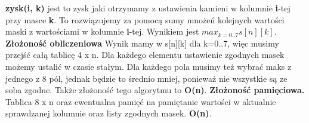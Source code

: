 \documentclass[a4paper,10pt]{article}
\begin{document}
 \textbf{zysk(i, k)} jest to zysk jaki otrzymamy z ustawienia kamieni w kolumnie \textbf{i}-tej przy masce \textbf{k}. To rozwiązujemy za pomocą sumy mnożeń kolejnych wartości maski z wartościami w kolumnie \textbf{i}-tej. \newline \newline
Wynikiem jest $max_{k=0..7}s[n][k]$. \newline \newline
\textbf{Złożoność obliczeniowa} \newline
Wynik mamy w s[n][k] dla k=0..7, więc musimy przejść całą tablicę 4 x n. Dla każdego elementu ustawienie zgodnych masek możemy ustalić w czasie stałym. Dla każdego pola musimy też wybrać maks z jednego z 8 pól, jednak będzie to średnio mniej, ponieważ nie wszystkie są ze soba zgodne. Także złożoność tego algorytmu to \textbf{O(n)}. \newline \newline
\textbf{Złożoność pamięciowa.} \newline
Tablica 8 x n oraz ewentualna pamięć na pamiętanie wartości w aktualnie sprawdzanej kolumnie oraz listy zgodnych masek.  \textbf{O(n)}.
\end{document}
